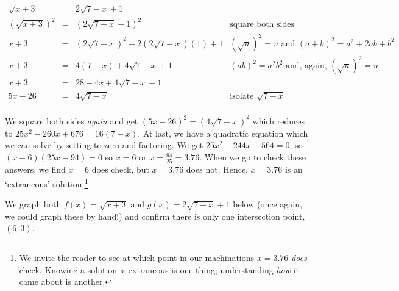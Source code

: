 \documentclass{ximera}
\begin{document}
\begin{ex}
\begin{enumerate}
\[ \begin{array}{rclr}

\sqrt{x+3} & = & 2\sqrt{7-x} + 1 & \\

 (\sqrt{x+3})^2 & = & (2\sqrt{7-x} + 1)^2 & \text{square both sides} \\
 
 x+3 & = & (2 \sqrt{7-x})^2 + 2 (2 \sqrt{7-x})(1) + 1 & \text{$(\sqrt{u})^2 = u$ and $(a+b)^2 = a^2 + 2ab +b^2$} \\

 
 x+3 & = & 4(7-x) + 4\sqrt{7-x} + 1 &  \text{$(ab)^2 = a^2b^2$ and, again, $(\sqrt{u})^2 = u$} \\
 
 x+3 & = & 28-4x+4\sqrt{7-x} + 1 & \\
 
 5x-26 & = & 4\sqrt{7-x} & \text{isolate $\sqrt{7-x}$} \\ \end{array} \]
 
We square both sides \textit{again} and get $(5x-26)^2 = (4\sqrt{7-x})^2$ which reduces to $25x^2-260x+676 = 16(7-x)$. At last, we have a quadratic equation which we can solve by setting to zero and factoring.  We get  $25x^2-244x+564 = 0$, so $(x-6)(25x-94) = 0$ so $x = 6$ or $x = \frac{94}{25} = 3.76$.  When we go to check these answers, we find $x=6$ does check, but $x = 3.76$ does not. Hence, $x=3.76$ is an `extraneous' solution.\footnote{We invite the reader to see at which point in our machinations $x=3.76$ \textit{does} check.  Knowing a solution is extraneous is one thing;  understanding \textit{how} it came about is another.}

We graph both $f(x) = \sqrt{x+3}$ and $g(x) = 2\sqrt{7-x} + 1$ below (once again, we could graph these by hand!) and confirm there is only one intersection point, $(6,3)$.


\end{enumerate}
\end{ex}
\end{document}
